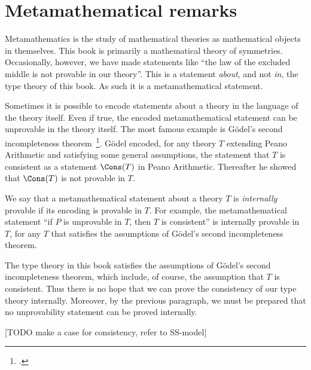 \chapter{Metamathematical remarks}
\label{app:metamath}

Metamathematics is the study of mathematical theories as
mathematical objects in themselves.
This book is primarily a mathematical theory of symmetries.
Occasionally, however, we have made statements like
``the law of the excluded middle is not provable in our theory''.
This is a statement \emph{about}, and not \emph{in}, the type theory of this book.
As such it is a metamathematical statement.

Sometimes it is possible to encode statements
about a theory in the language of the theory itself.%
Even if true, the encoded metamathematical statement can
be unprovable in the theory itself.
The most famous example is G\"{o}del's second incompleteness theorem~\footcite{Goedel2nd}.
G\"{o}del encoded, for any theory $T$ extending Peano Arithmetic and satisfying
some general assumptions, the statement that $T$ is consistent as
a statement $\Cons(T)$ in Peano Arithmetic. Thereafter he showed
that $\Cons(T)$ is not provable in $T$.

We say that a metamathematical statement about a theory $T$
is \emph{internally} provable if its encoding is provable in $T$.
For example, the metamathematical statement ``if $P$ is unprovable in $T$,
then $T$ is consistent'' is internally provable in $T$, for any $T$ that
satisfies the assumptions of G\"{o}del's second incompleteness theorem.

The type theory in this book satisfies the assumptions of
G\"{o}del's second incompleteness theorem, which include, of course,
the assumption that $T$ is consistent. Thus there is no hope
that we can prove the consistency of our type theory internally.
Moreover, by the previous paragraph, we must be prepared that
no unprovability statement can be proved internally.

[TODO make a case for consistency, refer to SS-model]

